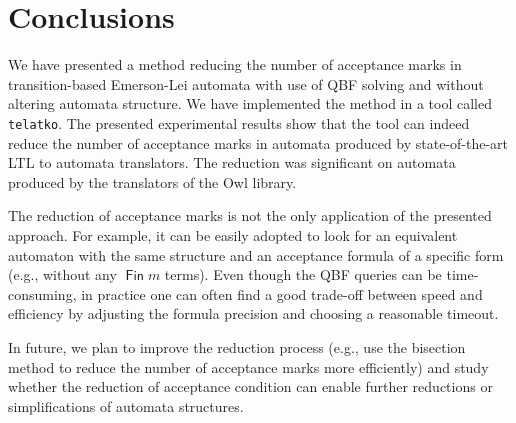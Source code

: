 \documentclass[a4paper,UKenglish,cleveref,autoref,thm-restate]{lipics-v2021}
\DeclareMathOperator{\Fin}{\mathsf{Fin}}
\begin{document}

\section{Conclusions}\label{sec:conclusion}

We have presented a method reducing the number of acceptance marks in
transition-based Emerson-Lei automata with use of QBF solving and
without altering automata structure. We have implemented the method in
a tool called \texttt{telatko}. The presented experimental results
show that the tool can indeed reduce the number of acceptance marks in
automata produced by state-of-the-art LTL to automata translators. The
reduction was significant on automata produced by the translators of
the Owl library.

The reduction of acceptance marks is not the only application of the
presented approach. For example, it can be easily adopted to look for
an equivalent automaton with the same structure and an acceptance
formula of a specific form (e.g., without any $\Fin m$ terms). Even
though the QBF queries can be time-consuming, in practice one can
often find a good trade-off between speed and efficiency by adjusting 
the formula precision and choosing a reasonable timeout.

In future, we plan to improve the reduction process (e.g., use the
bisection method to reduce the number of acceptance marks more
efficiently) and study whether the reduction of acceptance condition
can enable further reductions or simplifications of automata
structures.





%

\end{document}
